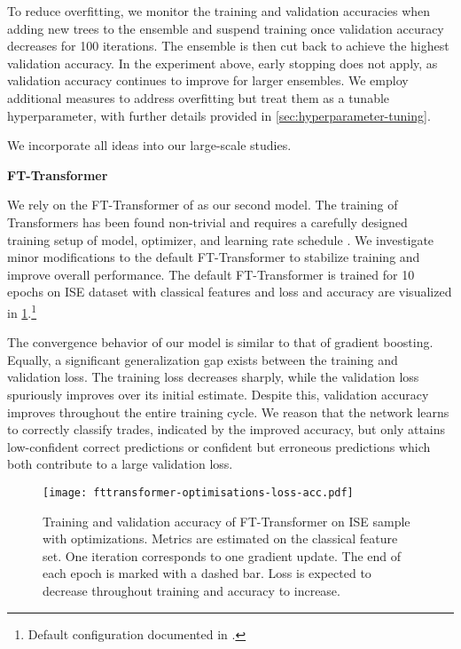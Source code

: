 To reduce overfitting, we monitor the training and validation accuracies when adding new trees to the ensemble and suspend training once validation accuracy decreases for \num{100} iterations. The ensemble is then cut back to achieve the highest validation accuracy. In the experiment above, early stopping does not apply, as validation accuracy continues to improve for larger ensembles. We employ additional measures to address overfitting but treat them as a tunable hyperparameter, with further details provided in \cref{sec:hyperparameter-tuning}.

We incorporate all ideas into our large-scale studies.

\textbf{FT-Transformer}

We rely on the FT-Transformer of \textcite[][18935--18936]{gorishniyRevisitingDeepLearning2021} as our second model. The training of Transformers has been found non-trivial and requires a carefully designed training setup of model, optimizer, and learning rate schedule \autocite[\checkmark][5747]{liuUnderstandingDifficultyTraining2020}. We investigate minor modifications to the default FT-Transformer to stabilize training and improve overall performance. The default FT-Transformer is trained for 10 epochs on \gls{ISE} dataset with classical features and loss and accuracy are visualized in \cref{fig:fttransformer-optimizations-loss-acc}.\footnote{Default configuration documented in \textcite[\checkmark][18949]{gorishniyRevisitingDeepLearning2021}.}

The convergence behavior of our model is similar to that of gradient boosting. Equally, a significant generalization gap exists between the training and validation loss. The training loss decreases sharply, while the validation loss spuriously improves over its initial estimate. Despite this, validation accuracy improves throughout the entire training cycle. We reason that the network learns to correctly classify trades, indicated by the improved accuracy, but only attains low-confident correct predictions or confident but erroneous predictions which both contribute to a large validation loss.

\begin{figure}[!ht]
    \centering
    \texttt{[image: fttransformer-optimisations-loss-acc.pdf]}
    \caption[Training and Validation Accuracy of FT-Transformer with Optimisations]{Training and validation accuracy of FT-Transformer on \gls{ISE} sample with optimizations. Metrics are estimated on the classical feature set. One iteration corresponds to one gradient update. The end of each epoch is marked with a dashed bar. Loss is expected to decrease throughout training and accuracy to increase.}
    \label{fig:fttransformer-optimizations-loss-acc}
\end{figure}

